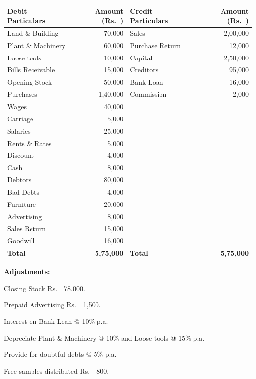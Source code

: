 \documentclass[11pt,a4paper]{article}
\newcommand{\rupee}{Rs.~}
\begin{document}
\begin{enumerate}[label=\textbf{\arabic*.},leftmargin=*,itemsep=14pt]
  \begin{center}
    \small
    \begin{tabular}{lr | lr}
      \toprule
      \textbf{Debit Particulars} & \textbf{Amount (\rupee)} & \textbf{Credit Particulars} & \textbf{Amount (\rupee)} \\
      \midrule
      Land \& Building & 70,000 & Sales & 2,00,000 \\
      Plant \& Machinery & 60,000 & Purchase Return & 12,000 \\
      Loose tools & 10,000 & Capital & 2,50,000 \\
      Bills Receivable & 15,000 & Creditors & 95,000 \\
      Opening Stock & 50,000 & Bank Loan & 16,000 \\
      Purchases & 1,40,000 & Commission & 2,000 \\
      Wages & 40,000 & & \\
      Carriage & 5,000 & & \\
      Salaries & 25,000 & & \\
      Rents \& Rates & 5,000 & & \\
      Discount & 4,000 & & \\
      Cash & 8,000 & & \\
      Debtors & 80,000 & & \\
      Bad Debts & 4,000 & & \\
      Furniture & 20,000 & & \\
      Advertising & 8,000 & & \\
      Sales Return & 15,000 & & \\
      Goodwill & 16,000 & & \\
      \midrule
      \textbf{Total} & \textbf{5,75,000} & \textbf{Total} & \textbf{5,75,000} \\
      \bottomrule
    \end{tabular}
  \end{center}

  \textbf{Adjustments:}
  \begin{parts}
    \item Closing Stock \rupee~78,000.
    \item Prepaid Advertising \rupee~1,500.
    \item Interest on Bank Loan @ 10\% p.a.
    \item Depreciate Plant \& Machinery @ 10\% and Loose tools @ 15\% p.a.
    \item Provide for doubtful debts @ 5\% p.a.
    \item Free samples distributed \rupee~800.
  \end{parts}


\end{enumerate}
\end{document}
